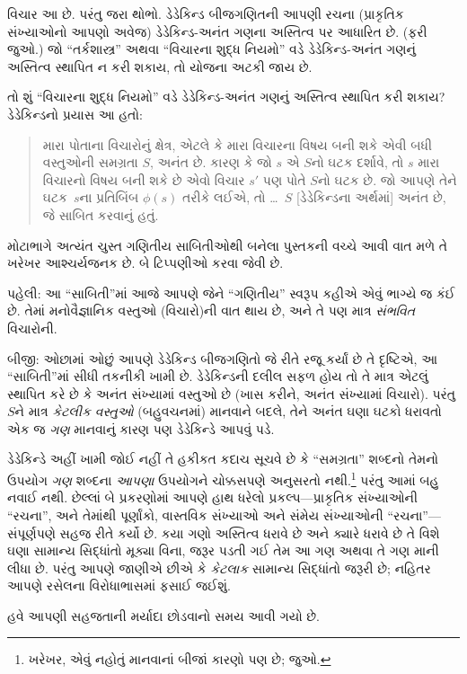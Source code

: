 વિચાર આ છે. પરંતુ જરા થોભો. ડેડેકિન્ડ બીજગણિતની આપણી રચના
(પ્રાકૃતિક સંખ્યાઓનો આપણો અવેજ) ડેડેકિન્ડ-અનંત ગણના અસ્તિત્વ પર
આધારિત છે. (ફરી 
જુઓ.) જો ``તર્કશાસ્ત્ર'' અથવા ``વિચારના શુદ્ધ નિયમો'' વડે
ડેડેકિન્ડ-અનંત ગણનું અસ્તિત્વ સ્થાપિત ન કરી શકાય, તો યોજના અટકી જાય છે.

તો શું ``વિચારના શુદ્ધ નિયમો'' વડે ડેડેકિન્ડ-અનંત ગણનું અસ્તિત્વ
સ્થાપિત કરી શકાય? ડેડેકિન્ડનો પ્રયાસ આ હતો:
\begin{quote}
  મારા પોતાના વિચારોનું ક્ષેત્ર, એટલે કે મારા વિચારના વિષય બની શકે
  એવી બધી વસ્તુઓની સમગ્રતા $S$, અનંત છે. કારણ કે જો $s$ એ $S$નો
  ઘટક દર્શાવે, તો $s$ મારા વિચારનો વિષય બની શકે છે એવો વિચાર $s'$ પણ
  પોતે $S$નો ઘટક છે. જો આપણે તેને ઘટક~$s$ના પ્રતિબિંબ $\phi(s)$ તરીકે
  લઈએ, તો \dots~$S$ [ડેડેકિન્ડના અર્થમાં] અનંત છે, જે સાબિત કરવાનું હતું.
	\citep[\S66]{Dedekind1888}
\end{quote}
મોટાભાગે અત્યંત ચુસ્ત ગણિતીય સાબિતીઓથી બનેલા પુસ્તકની વચ્ચે આવી વાત
મળે તે ખરેખર આશ્ચર્યજનક છે. બે ટિપ્પણીઓ કરવા જેવી છે.

પહેલી: આ ``સાબિતી''માં આજે આપણે જેને ``ગણિતીય'' સ્વરૂપ કહીએ એવું
ભાગ્યે જ કંઈ છે. તેમાં મનોવૈજ્ઞાનિક વસ્તુઓ (વિચારો)ની વાત થાય છે, અને
તે પણ માત્ર \emph{સંભવિત} વિચારોની.

બીજી: ઓછામાં ઓછું આપણે ડેડેકિન્ડ બીજગણિતો જે રીતે રજૂ કર્યાં છે તે
દૃષ્ટિએ, આ ``સાબિતી''માં સીધી તકનીકી ખામી છે. ડેડેકિન્ડની દલીલ સફળ
હોય તો તે માત્ર એટલું સ્થાપિત કરે છે કે અનંત સંખ્યામાં વસ્તુઓ છે
(ખાસ કરીને, અનંત સંખ્યામાં વિચારો). પરંતુ $S$ને માત્ર \emph{કેટલીક વસ્તુઓ} (બહુવચનમાં) માનવાને બદલે, તેને અનંત ઘણા ઘટકો ધરાવતો એક જ
\emph{ગણ} માનવાનું કારણ પણ ડેડેકિન્ડે આપવું પડે.

ડેડેકિન્ડે અહીં ખામી જોઈ નહીં તે હકીકત કદાચ સૂચવે છે કે
``સમગ્રતા'' શબ્દનો તેમનો ઉપયોગ \emph{ગણ} શબ્દના \emph{આપણા} ઉપયોગને
ચોક્કસપણે અનુસરતો નથી.\footnote{ખરેખર, એવું નહોતું માનવાનાં બીજાં
કારણો પણ છે; \citet[p.~23]{Potter2004} જુઓ.} પરંતુ આમાં બહુ નવાઈ નથી.
છેલ્લાં બે પ્રકરણોમાં આપણે હાથ ધરેલો પ્રકલ્પ---પ્રાકૃતિક સંખ્યાઓની
``રચના'', અને તેમાંથી પૂર્ણાંકો, વાસ્તવિક સંખ્યાઓ અને સંમેય સંખ્યાઓની
``રચના''---સંપૂર્ણપણે સહજ રીતે કર્યો છે. કયા ગણો અસ્તિત્વ ધરાવે છે અને
ક્યારે ધરાવે છે તે વિશે ઘણા સામાન્ય સિદ્ધાંતો મૂક્યા વિના, જરૂર પડતી
ગઈ તેમ આ ગણ અથવા તે ગણ માની લીધા છે. પરંતુ આપણે જાણીએ છીએ કે
\emph{કેટલાક} સામાન્ય સિદ્ધાંતો જરૂરી છે; નહિતર આપણે રસેલના
વિરોધાભાસમાં ફસાઈ જઈશું.

 હવે આપણી સહજતાની મર્યાદા છોડવાનો સમય આવી ગયો છે.
\endgroup

\begingroup
\makeatletter{}\makeatother


